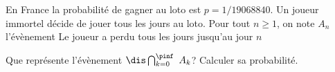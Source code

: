 \documentclass[a4paper,10pt]{report}
\begin{document}
\begin{ex} En France la probabilité de gagner au loto est $p=1/19 068 840$. Un joueur immortel décide de jouer tous les jours au loto. Pour tout $n \geq 1$, on note $A_n$ l'évènement \og Le joueur a perdu tous les jours jusqu'au jour $n$ \fg 

\noindent Que représente l'évènement $\dis \bigcap_{k=0}^{\pinf\ }A_k$? Calculer sa probabilité.

\vspace{9cm}
\end{ex}







% 
% 
% 
% 
%
% 
% 
%
%
% 
\end{document}

